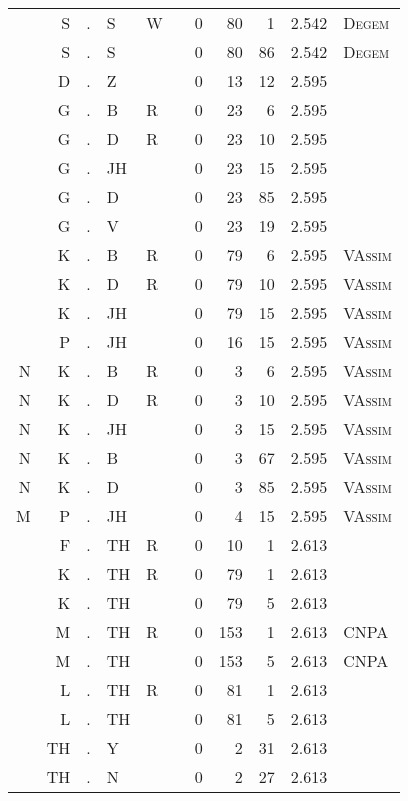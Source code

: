 \begin{longtable}{r@{ } r@{ } c@{ } l@{ } l@{ } l@{ } r r r r l }
  & S & . & S & W &   & 0 & 80 & 1 & 2.542 & \textsc{Degem} \\
  & S & . & S &   &   & 0 & 80 & 86 & 2.542 & \textsc{Degem} \\
  & D & . & Z &   &   & 0 & 13 & 12 & 2.595 &  \\
  & G & . & B & R &   & 0 & 23 & 6 & 2.595 &  \\
  & G & . & D & R &   & 0 & 23 & 10 & 2.595 &  \\
  & G & . & JH &   &   & 0 & 23 & 15 & 2.595 &  \\
  & G & . & D &   &   & 0 & 23 & 85 & 2.595 &  \\
  & G & . & V &   &   & 0 & 23 & 19 & 2.595 &  \\
  & K & . & B & R &   & 0 & 79 & 6 & 2.595 & \textsc{VAssim} \\
  & K & . & D & R &   & 0 & 79 & 10 & 2.595 & \textsc{VAssim} \\
  & K & . & JH &   &   & 0 & 79 & 15 & 2.595 & \textsc{VAssim} \\
  & P & . & JH &   &   & 0 & 16 & 15 & 2.595 & \textsc{VAssim} \\
N & K & . & B & R &   & 0 & 3 & 6 & 2.595 & \textsc{VAssim} \\
N & K & . & D & R &   & 0 & 3 & 10 & 2.595 & \textsc{VAssim} \\
N & K & . & JH &   &   & 0 & 3 & 15 & 2.595 & \textsc{VAssim} \\
N & K & . & B &   &   & 0 & 3 & 67 & 2.595 & \textsc{VAssim} \\
N & K & . & D &   &   & 0 & 3 & 85 & 2.595 & \textsc{VAssim} \\
M & P & . & JH &   &   & 0 & 4 & 15 & 2.595 & \textsc{VAssim} \\
  & F & . & TH & R &   & 0 & 10 & 1 & 2.613 &  \\
  & K & . & TH & R &   & 0 & 79 & 1 & 2.613 &  \\
  & K & . & TH &   &   & 0 & 79 & 5 & 2.613 &  \\
  & M & . & TH & R &   & 0 & 153 & 1 & 2.613 & \textsc{CNPA} \\
  & M & . & TH &   &   & 0 & 153 & 5 & 2.613 & \textsc{CNPA} \\
  & L & . & TH & R &   & 0 & 81 & 1 & 2.613 &  \\
  & L & . & TH &   &   & 0 & 81 & 5 & 2.613 &  \\
  & TH & . & Y &   &   & 0 & 2 & 31 & 2.613 &  \\
  & TH & . & N &   &   & 0 & 2 & 27 & 2.613 &  \\

\end{longtable}
